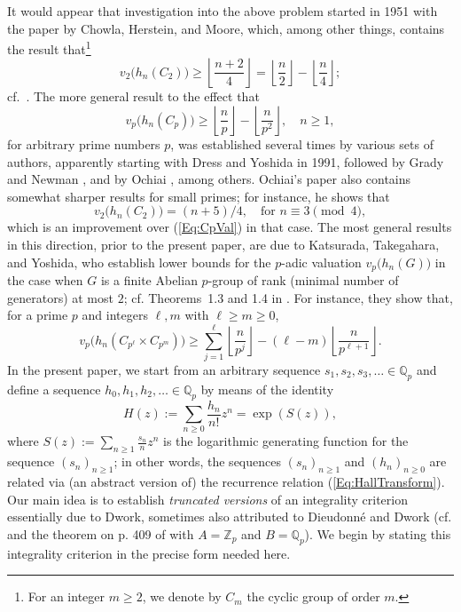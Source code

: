 \documentclass[12pt,reqno]{amsart}
\numberwithin{equation}{section}
\theoremstyle{remark}
\begin{document}
It would appear that investigation into the above problem started in 1951
with the paper \cite{ChHMAA} by Chowla, Herstein, and Moore, which,
among other things, contains the result that\footnote{For an integer
  $m\geq2$, we denote by $C_m$ the cyclic group of order $m$.}  
\begin{equation} \label{eq:hnC2} 
v_2\big(h_n(C_2)\big) \geq {\left\lfloor{\frac{n+2}{4}}\right\rfloor} = 
{\left\lfloor{\frac{n}{2}}\right\rfloor} - {\left\lfloor{ \frac{n}{4}}\right\rfloor};  
\end{equation}
cf.\ \cite[Theorem~10]{ChHMAA}. The more general result to the effect that 
\begin{equation}
\label{Eq:CpVal}
v_p\big(h_n(C_p)\big) \geq {\left\lfloor{ \frac{n}{p}}\right\rfloor} - 
{\left\lfloor{\frac{n}{p^2}}\right\rfloor},\quad n\geq1, 
\end{equation}
for arbitrary prime numbers $p$, 
was established several times by various sets of
authors, apparently starting with Dress and Yoshida 
 \cite{DrYoAA} in 1991, followed by Grady and Newman
 \cite{GrNeAA}, and by Ochiai \cite[Sec.~3.2]{Ochiai}, among others. 
Ochiai's paper also contains somewhat sharper results for small
 primes; for instance, he shows that  
\[
v_2\big(h_n(C_2)\big) = 
(n+5)/4, \quad \text{for }n\equiv 3\pmod{4},
\]
which is an improvement over (\ref{Eq:CpVal}) in that case. 
The most general results in this direction, prior to the present
paper, are due to Katsurada, Takegahara, and  Yoshida, who establish
lower bounds for the $p$-adic valuation $v_p\big(h_n(G)\big)$ in the case when
$G$ is a finite Abelian $p$-group of rank (minimal number of
generators) at most $2$;
cf. Theorems~1.3 and 1.4 in \cite{KaTYAA}. For instance, they show
that, for a prime $p$ and integers $\ell, m$ with $\ell \geq m\geq0$, 
\[
v_p\big(h_n(C_{p^\ell} \times C_{p^m})\big) \geq
\sum\limits_{j=1}^\ell{\left\lfloor{\frac{n}{p^j}}\right\rfloor} - (\ell - m)
{\left\lfloor{\frac{n}{p^{\ell+1}}}\right\rfloor}.
\]
In the present paper, we start from an arbitrary sequence $s_1, s_2,
s_3, \ldots\in {\mathbb{Q}}_p$ and define a sequence $h_0, h_1,
h_2,\ldots\in{\mathbb{Q}}_p$ by means of the identity 
\[
H(z):= \sum_{n\geq0} \frac {h_n} {n!} z^n = \exp\left(S(z)\right),
\]
where $S(z):= \sum_{n\geq1} \frac{s_n}{n} z^n$ is the logarithmic
generating function for the sequence $(s_n)_{n\geq1}$; in other words,
the sequences $(s_n)_{n\geq1}$ and
$(h_n)_{n\geq0}$ are related via (an abstract version of) the
recurrence relation (\ref{Eq:HallTransform}). Our main idea is to
establish \textit{truncated versions} of an integrality criterion
essentially due to Dwork, sometimes also attributed to Dieudonn\'e and
Dwork (cf. \cite[Ch.~14, p.~76]{LangAA} and the theorem on p. 409 of
\cite{RobeAA} with $A = {\mathbb{Z}}_p$ and $B = {\mathbb{Q}}_p$). We begin by stating
this integrality criterion in the precise form needed here. 
\end{document}
